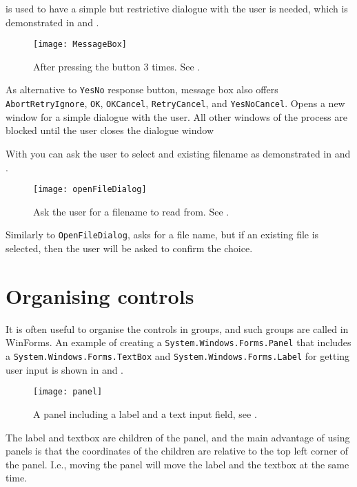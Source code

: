  is used to have a simple but restrictive dialogue with the user is needed, which is demonstrated in  and .
%
%
\begin{figure}
  \centering
  \texttt{[image: MessageBox]}
  \caption{After pressing the button 3 times. See .}
  \label{fig:MessageBox}
\end{figure}
%
As alternative to \lstinline{YesNo} response button, message box also offers \lstinline{AbortRetryIgnore}, \lstinline{OK}, \lstinline{OKCancel}, \lstinline{RetryCancel}, and \lstinline{YesNoCancel}. Opens a new window for a simple dialogue with the user. All other windows of the process are blocked until the user closes the dialogue window

With  you can ask the user to select and existing filename as demonstrated in  and .
%
%
\begin{figure}
  \centering
  \texttt{[image: openFileDialog]}
  \caption{Ask the user for a filename to read from. See .}
  \label{fig:openFileDialog}
\end{figure}
%
Similarly to \lstinline{OpenFileDialog},  asks for a file name, but if an existing file is selected, then the user will be asked to confirm the choice.

\section{Organising controls}
It is often useful to organise the controls in groups, and such groups are called  in WinForms. An example of creating a \lstinline{System.Windows.Forms.Panel} that includes a \lstinline{System.Windows.Forms.TextBox} and \lstinline{System.Windows.Forms.Label} for getting user input is shown in  and . 
%
%
\begin{figure}
  \centering
  \texttt{[image: panel]}
  \caption{A panel including a label and a text input field, see .}
  \label{fig:panel}
\end{figure}
The label and textbox are children of the panel, and the main advantage of using panels is that the coordinates of the children are relative to the top left corner of the panel. I.e., moving the panel will move the label and the textbox at the same time.

